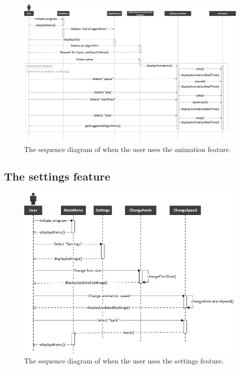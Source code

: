 \begin{landscape}
\begin{figure}[H]
\centering
\includegraphics[scale=0.55]{images/report_images/sequenceDiagramShowAlgorithmList.png}
\caption{The sequence diagram of when the user uses the animation feature.}
\label{sequenceDiagramShowAlgorithmList}
\end{figure}
\end{landscape}

\newpage

\subsection{The settings feature}

\begin{figure}[H]
\centering
\hspace*{-1cm}
\includegraphics[scale=0.9]{images/report_images/sequenceDiagramSettings.png}
\caption{The sequence diagram of when the user uses the settings feature.}
\label{sequenceDiagramSettings}
\end{figure}

